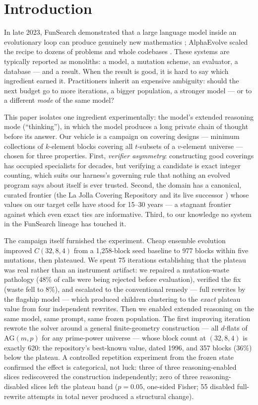 \section{Introduction}

In late 2023, FunSearch demonstrated that a large language model
inside an evolutionary loop can produce genuinely new mathematics
\cite{romera2024funsearch}; AlphaEvolve scaled the recipe to dozens
of problems and whole codebases \cite{novikov2025alphaevolve}. These
systems are typically reported as monoliths: a model, a mutation
scheme, an evaluator, a database --- and a result. When the result is
good, it is hard to say which ingredient earned it. Practitioners
inherit an expensive ambiguity: should the next budget go to more
iterations, a bigger population, a stronger model --- or to a
different \emph{mode} of the same model?

This paper isolates one ingredient experimentally: the model's
extended reasoning mode (``thinking''), in which the model produces a
long private chain of thought before its answer. Our vehicle is a
campaign on covering designs --- minimum collections of $k$-element
blocks covering all $t$-subsets of a $v$-element universe --- chosen
for three properties. First, \emph{verifier asymmetry}: constructing
good coverings has occupied specialists for decades, but verifying a
candidate is exact integer counting, which suits our harness's
governing rule that nothing an evolved program says about itself is
ever trusted. Second, the domain has a canonical, curated frontier
(the La Jolla Covering Repository and its live successor
\cite{ljcr}) whose values on our target cells have stood for 15--30
years --- a stagnant frontier against which even exact ties are
informative. Third, to our knowledge no system in the FunSearch
lineage has touched it.

The campaign itself furnished the experiment. Cheap ensemble
evolution improved $C(32,8,4)$ from a 1{,}258-block seed baseline to
977 blocks within five mutations, then plateaued. We spent 75
iterations establishing that the plateau was real rather than an
instrument artifact: we repaired a mutation-waste pathology (48\% of
calls were being rejected before evaluation), verified the fix (waste
fell to 8\%), and escalated to the conventional remedy --- full
rewrites by the flagship model --- which produced children clustering
to the \emph{exact} plateau value from four independent rewrites.
Then we enabled extended reasoning on the same model, same prompt,
same frozen population. The first improving iteration rewrote the
solver around a general finite-geometry construction --- all
$d$-flats of $\mathrm{AG}(m,p)$ for any prime-power universe --- whose
block count at $(32,8,4)$ is exactly 620: the repository's best-known
value, dated 1996, and 357 blocks (36\%) below the plateau. A
controlled repetition experiment from the frozen state confirmed the
effect is categorical, not luck: three of three reasoning-enabled
slices rediscovered the construction independently; zero of three
reasoning-disabled slices left the plateau band ($p = 0.05$,
one-sided Fisher; 55 disabled full-rewrite attempts in total never
produced a structural change).


